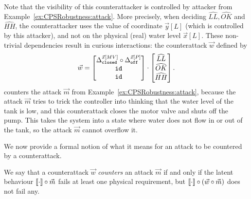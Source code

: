 {{\begin{example}
  Note that the visibility of this counterattacker is controlled by attacker from Example~\ref{ex:CPSRobustness:attack}. More precisely, when deciding $\widehat{LL},\widehat{OK}$ and $\widehat{HH}$, the counterattacker uses the value of coordinate $\vec{y}[L]$ (which is controlled by this attacker), and not on the physical (real) water level $\vec{x}[L]$. These non-trivial dependencies result in curious interactions:
  the counterattack $\vec{w}$ defined by
  \begin{align}
    \vec{w}=
    \begin{bmatrix}
      {\Delta}^{\vec{x}[MV]}_{\texttt{closed}} \circ {\Delta}^{\vec{x}[P]}_{\texttt{off}} \\
      {\texttt{id}} \\
      {\texttt{id}}
    \end{bmatrix}
    \cdot
    \begin{bmatrix}
      \widehat{LL} \\
      \widehat{OK}\\
      \widehat{HH}
    \end{bmatrix}.
  \end{align}
counters the attack $\vec{m}$ from Example~\ref{ex:CPSRobustness:attack}, because the attack $\vec{m}$ tries to trick the controller into thinking that the water level of the tank is low, and this counterattack closes the motor valve and shuts off the pump. This takes the system into a state where water does not flow in or out of the tank, so the attack $\vec{m}$ cannot overflow it.
\end{example}
We now provide a formal notion of what it means for an attack to be countered by a counterattack.
\begin{definition}
  We say that a counterattack $\vec{w}$ \emph{counters} an attack $\vec{m}$ if and only if the latent behaviour ${{{\llbracket\cdot\rrbracket}}}\circ\vec{m}$ fails at least one physical requirement, but ${{{\llbracket\cdot\rrbracket}}}\circ(\vec{w}\circ\vec{m})$ does not fail any.
\end{definition}

}}
